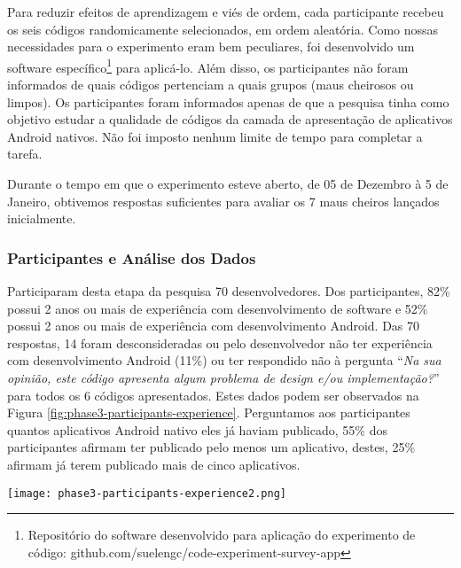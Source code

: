 Para reduzir efeitos de aprendizagem e viés de ordem, cada participante recebeu os seis códigos randomicamente selecionados, em ordem aleatória. Como nossas necessidades para o experimento eram bem peculiares, foi desenvolvido um software específico\footnote{Repositório do software desenvolvido para aplicação do experimento de código: github.com/suelengc/code-experiment-survey-app} para aplicá-lo. Além disso, os participantes não foram informados de quais códigos pertenciam a quais grupos (maus cheirosos ou limpos). Os participantes foram informados apenas de que a pesquisa tinha como objetivo estudar a qualidade de códigos da camada de apresentação de aplicativos Android nativos. Não foi imposto nenhum limite de tempo para completar a tarefa.

Durante o tempo em que o experimento esteve aberto, de 05 de Dezembro à 5 de Janeiro, obtivemos respostas suficientes para avaliar os 7 maus cheiros lançados inicialmente.


\subsubsection{Participantes e Análise dos Dados}
\label{etapa-3-participantes-analise}

Participaram desta etapa da pesquisa 70 desenvolvedores. Dos participantes, 82\% possui 2 anos ou mais de experiência com desenvolvimento de software e 52\% possui 2 anos ou mais de experiência com desenvolvimento Android. Das 70 respostas, 14 foram desconsideradas ou pelo desenvolvedor não ter experiência com desenvolvimento Android (11\%) ou ter respondido não à pergunta ``\textit{Na sua opinião, este código apresenta algum problema de design e/ou implementação?}'' para todos os 6 códigos apresentados. Estes dados podem ser observados na Figura \ref{fig:phase3-participants-experience}. Perguntamos aos participantes quantos aplicativos Android nativo eles já haviam publicado, 55\% dos participantes afirmam ter publicado pelo menos um aplicativo, destes, 25\% afirmam já terem publicado mais de cinco aplicativos.


\begin{figure*}[!b]
\centering
\texttt{[image: phase3-participants-experience2.png]}
\caption{Tempo de experiência com desenvolvimento de software e desenvolvimento Android dos participantes de S$_3$.}
\label{fig:phase3-participants-experience}
\vspace{-.5cm} 
\end{figure*}

